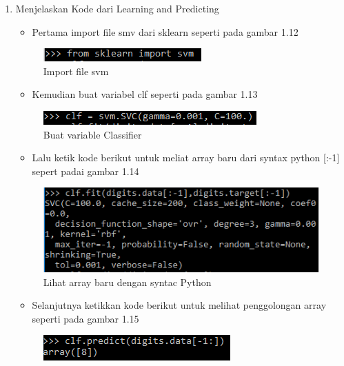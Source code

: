 \begin{enumerate}
\item Menjelaskan Kode dari Learning and Predicting
\begin{itemize}
\item Pertama import file smv dari sklearn seperti pada gambar 1.12
\end{itemize}
\begin{figure}[ht]
\centering
\includegraphics[scale=0.9]{figures/2_1.png}
\caption{Import file svm}
\label{Import svm}
\end{figure}
\begin{itemize}
\item Kemudian buat variabel clf seperti pada gambar 1.13
\end{itemize}
\begin{figure}[ht]
\centering
\includegraphics[scale=0.9]{figures/2_2.png}
\caption{Buat variable Classifier}
\label{Variabel clf}
\end{figure}
\begin{itemize}
\item Lalu ketik kode berikut untuk meliat array baru dari syntax python [:-1] sepert padai gambar 1.14
\end{itemize}
\begin{figure}[ht]
\centering
\includegraphics[scale=0.7]{figures/2_3.png}
\caption{Lihat array baru dengan syntac Python}
\label{Syntax python}
\end{figure}
\begin{itemize}
\item Selanjutnya ketikkan kode berikut untuk melihat penggolongan array seperti pada gambar 1.15
\end{itemize}
\begin{figure}[ht]
\centering
\includegraphics[scale=0.7]{figures/2_4.png}

\end{figure}
\end{enumerate}
